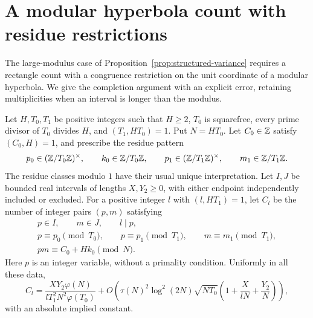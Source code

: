 \section[A modular hyperbola count]{A modular hyperbola count with residue restrictions}
\label{sec:hyperbola}

The large-modulus case of Proposition~\ref{prop:structured-variance}
requires a rectangle count with a congruence restriction on the unit
coordinate of a modular hyperbola.  We give the completion argument with
an explicit error, retaining multiplicities when an interval is longer
than the modulus.

\begin{lemma}
\label{lem:hyperbola}
Let $H,T_0,T_1$ be positive integers such that $H\ge2$, $T_0$ is
squarefree, every prime divisor of $T_0$ divides $H$, and
$(T_1,HT_0)=1$.  Put $N=HT_0$.  Let $C_0\in\mathbb Z$ satisfy $(C_0,H)=1$,
and prescribe the residue pattern
\begin{equation}
\label{eq:hyperbola-pattern}
 p_0\in(\mathbb Z/T_0\mathbb Z)^\times,\qquad k_0\in\mathbb Z/T_0\mathbb Z,\qquad
 p_1\in(\mathbb Z/T_1\mathbb Z)^\times,\qquad m_1\in\mathbb Z/T_1\mathbb Z.
\end{equation}
The residue classes modulo $1$ have their usual unique interpretation.
Let $I,J$ be bounded real intervals of lengths $X,Y_2\ge0$, with either
endpoint independently included or excluded.  For a positive integer
$l$ with $(l,HT_1)=1$, let $C_l$ be the number of integer pairs $(p,m)$
satisfying
\begin{equation}
\label{eq:hyperbola-counted-set}
\begin{gathered}
 p\in I,\qquad m\in J,\qquad l\mid p,\\
 p\equiv p_0\pmod{T_0},\qquad
 p\equiv p_1\pmod{T_1},\qquad
 m\equiv m_1\pmod{T_1},\\
 pm\equiv C_0+Hk_0\pmod N.
\end{gathered}
\end{equation}
Here $p$ is an integer variable, without a primality condition.
Uniformly in all these data,
\begin{equation}
\label{eq:hyperbola-explicit-count}
 C_l=
 \frac{XY_2\varphi(N)}{lT_1^2N^2\varphi(T_0)}
 +O\left(
 \tau(N)^2\log^2(2N)\sqrt{NT_0}
 \left(1+\frac{X}{lN}+\frac{Y_2}{N}\right)
 \right),
\end{equation}
with an absolute implied constant.


\end{lemma}
